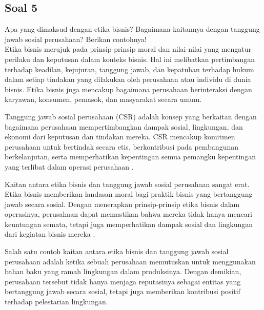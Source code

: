\documentclass[12pt]{article}
\begin{document}






\subsection*{Soal 5}
\noindent
Apa yang dimaksud dengan etika bisnis? Bagaimana kaitannya dengan tanggung jawab sosial perusahaan? Berikan contohnya!\\


Etika bisnis merujuk pada prinsip-prinsip moral dan nilai-nilai yang mengatur perilaku dan keputusan dalam konteks bisnis. Hal ini melibatkan pertimbangan terhadap keadilan, kejujuran, tanggung jawab, dan kepatuhan terhadap hukum dalam setiap tindakan yang dilakukan oleh perusahaan atau individu di dunia bisnis. Etika bisnis juga mencakup bagaimana perusahaan berinteraksi dengan karyawan, konsumen, pemasok, dan masyarakat secara umum.

Tanggung jawab sosial perusahaan (CSR) adalah konsep yang berkaitan dengan bagaimana perusahaan mempertimbangkan dampak sosial, lingkungan, dan ekonomi dari keputusan dan tindakan mereka. CSR mencakup komitmen perusahaan untuk bertindak secara etis, berkontribusi pada pembangunan berkelanjutan, serta memperhatikan kepentingan semua pemangku kepentingan yang terlibat dalam operasi perusahaan \autocite[340]{trevino2016managing}.

Kaitan antara etika bisnis dan tanggung jawab sosial perusahaan sangat erat. Etika bisnis memberikan landasan moral bagi praktik bisnis yang bertanggung jawab secara sosial. Dengan menerapkan prinsip-prinsip etika bisnis dalam operasinya, perusahaan dapat memastikan bahwa mereka tidak hanya mencari keuntungan semata, tetapi juga memperhatikan dampak sosial dan lingkungan dari kegiatan bisnis mereka \autocite{trevino2016managing}.

Salah satu contoh kaitan antara etika bisnis dan tanggung jawab sosial perusahaan adalah ketika sebuah perusahaan memutuskan untuk menggunakan bahan baku yang ramah lingkungan dalam produksinya. Dengan demikian, perusahaan tersebut tidak hanya menjaga reputasinya sebagai entitas yang bertanggung jawab secara sosial, tetapi juga memberikan kontribusi positif terhadap pelestarian lingkungan\autocite[50]{trevino2016managing}.
\end{document}
